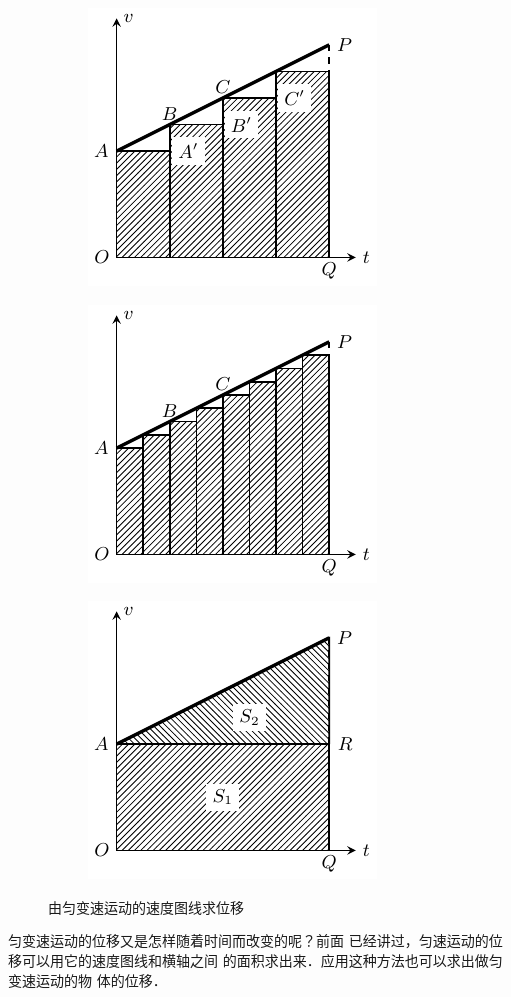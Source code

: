 \begin{figure}[htp]
    \centering
    \begin{subfigure} {0.48\linewidth} 
		\centering
		\includegraphics{fig/A/2-19a.pdf}
		\caption{}\label{fig_A_2-19a}
	\end{subfigure}
	\begin{subfigure} {0.48\linewidth} 
		\centering
		\includegraphics{fig/A/2-19b.pdf} 
		\caption{}\label{fig_A_2-19b}
	\end{subfigure}
	\begin{subfigure} {0.48\linewidth} 
		\centering
		\includegraphics{fig/A/2-19c.pdf} 
		\caption{}\label{fig_A_2-19c}
	\end{subfigure}
    \caption{由匀变速运动的速度图线求位移}\label{fig_A_2-19}
\end{figure}
   匀变速运动的位移又是怎样随着时间而改变的呢？前面
已经讲过，匀速运动的位移可以用它的速度图线和横轴之间
的面积求出来．应用这种方法也可以求出做匀变速运动的物
体的位移．

